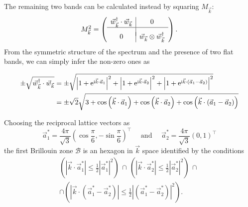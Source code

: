 \documentclass[prl,aps,twocolumn,showpacs,superscriptaddress,longbibliography]{revtex4-1}
\newcommand{\be}{\begin{equation}}
\newcommand{\ee}{\end{equation}}
\newcommand{\matb}{\left(\begin{array}}
\newcommand{\mate}{\end{array}\right)}
\newcommand{\mal}{\mathcal}
\newcommand{\rmi}{{\rm{i}}}
\newcommand{\rme}[1]{{\rm{e}}^{#1}}
\newcommand{\mand}{\quad\text{ and }\quad}
\newcommand{\ha}{\frac{1}{2}}
\newcommand{\lt}{\left(}
\newcommand{\rt}{\right)}
\newcommand{\abs}[1]{\left| #1 \right|}
\newcommand{\cosa}[1]{\cos \left(  #1 \right)}
\begin{document}
The remaining two bands can be calculated instead by squaring ${M}_{\vec{k}}$:
\be
	M_{\vec{k}}^2 =  \matb{c|c} \vec{w}^\dag_{\vec{k}} \cdot \vec{w}_{\vec{k}} & 0  \\ \hline \\[-2mm] 0 & \vec{w}_{\vec{k}} \otimes \vec{w}^\dag_{\vec{k}} \mate.   
\ee
From the symmetric structure of the spectrum and the presence of two flat bands, we can simply infer the non-zero ones as
\begin{widetext}
\be
\begin{split}
	\pm \sqrt{\vec{w}^\dag_{\vec{k}} \cdot \vec{w}_{\vec{k}}} & = \pm \sqrt{ \abs{1 + \rme{\rmi\vec{k} \cdot \vec{a}_1} }^2 + \abs{  1 + \rme{\rmi\vec{k} \cdot \vec{a}_2} }^2 + \abs{  1 + \rme{\rmi\vec{k} \cdot( \vec{a}_1 - \vec{a}_2)}}^2 }\\ 
	& = \pm \sqrt{2} \sqrt{3 + \cosa{ \vec{k} \cdot \vec{a}_1} + \cosa{ \vec{k} \cdot \vec{a}_2} + \cosa{ \vec{k} \cdot (\vec{a}_1 - \vec{a}_2)}}
\end{split}
\ee
\end{widetext}


Choosing the reciprocal lattice vectors as 
\be
	\vec{a}_1^\ast = \frac{4\pi}{\sqrt{3}} \lt \cos \frac{\pi}{6}, -\sin \frac{\pi}{6} \rt^\intercal \mand \vec{a}_2^\ast = \frac{4\pi}{\sqrt{3}} \lt 0, 1 \rt^\intercal
\ee
the first Brillouin zone $\mal{B}$ is an hexagon in $\vec{k}$ space identified by the conditions
\be
\begin{split}
	\lt \abs{\vec{k} \cdot \vec{a}_1^\ast} \leq \ha \abs{\vec{a}_1^\ast}^2 \rt  \,\cap\, \lt \abs{\vec{k} \cdot \vec{a}_2^\ast} \leq \ha \abs{\vec{a}_2^\ast}^2  \rt \,\cap\,  \\
	\cap  \lt \abs{\vec{k} \cdot (\vec{a}_1^\ast - \vec{a}_2^\ast)} \leq \ha \abs{(\vec{a}_1^\ast - \vec{a}_2^\ast)}^2 \rt.
	\label{eq:conditions}
\end{split}
\ee
\end{document}
